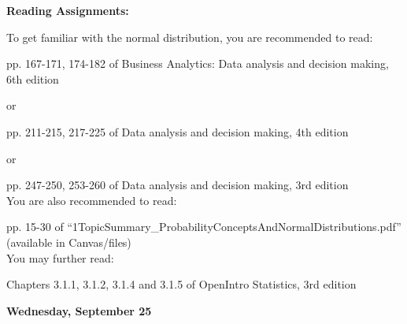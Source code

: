 \documentclass[11pt]{article}
\begin{document}
\noindent\textbf{Reading Assignments:}

To get familiar with the normal distribution, you are recommended to read:

pp. 167-171, 174-182 of Business Analytics: Data analysis and decision making, 6th edition

or

pp. 211-215, 217-225 of Data analysis and decision making, 4th edition

or 

pp. 247-250, 253-260 of  Data analysis and decision making, 3rd edition\\

You are also recommended to read:

pp. 15-30 of ``1TopicSummary\_ProbabilityConceptsAndNormalDistributions.pdf'' (available in Canvas/files) \\


You may further read:

Chapters 3.1.1, 3.1.2, 3.1.4 and 3.1.5 of OpenIntro Statistics, 3rd edition %

%
%
%
%
%




\noindent\textbf{\large Wednesday, September 25} 	
\end{document}
